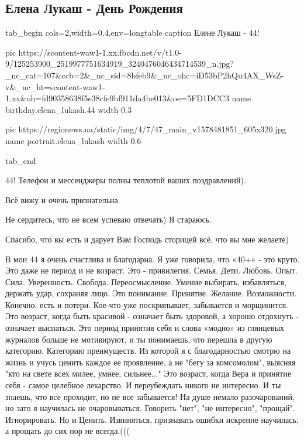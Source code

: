  
 

 

\subsection{Елена Лукаш - День Рождения}
\label{sec:12_11_2020.fb.elena_lukash.1.dr_44}

\ifcmt
tab_begin cols=2,width=0.4,env=longtable
  	caption Елене Лукаш - 44!

    pic https://scontent-waw1-1.xx.fbcdn.net/v/t1.0-9/125253900_2519977751634919_3240476046434714539_n.jpg?_nc_cat=107&ccb=2&_nc_sid=8bfeb9&_nc_ohc=iD53bP2hQu4AX_WsZ-v&_nc_ht=scontent-waw1-1.xx&oh=fd90358638f5e38cfe9bf911da4be013&oe=5FD1DCC3
    name birthday.elena_lukash.44
    width 0.3

    pic https://regionews.ua/static/img/4/7/47_main_v1578481851_605x320.jpg
    name portrait.elena_lukash
    width 0.6

tab_end
\fi

44!
\obeycr
Телефон и мессенджеры полны теплотой ваших поздравлений). 

Всё вижу и очень признательна.

Не сердитесь, что не всем успеваю отвечать) Я стараюсь. 

Спасибо, что вы есть и дарует Вам Господь сторицей всё, что вы мне желаете)  

В мои 44 я очень счастлива и благодарна.
Я уже говорила, что «40+» - это круто. 
Это даже не период и не возраст. 
Это - привилегия. 
Семья. Дети. Любовь. Опыт. Сила. Уверенность. Свобода. 
Переосмысление. 
Умение выбирать, избавляться, держать удар, сохраняя лицо. 
Это понимание.
Принятие. 
Желание. 
Возможности.   
Конечно, есть и потери. 
Кое-что уже поскрипывает, забывается и морщинится.
Это возраст, когда быть красивой - означает быть здоровой, а хорошо отдохнуть -  означает выспаться. 
Это период принятия себя и слова «модно» из глянцевых журналов больше не мотивируют, и ты понимаешь, что перешла в другую категорию. 
Категорию преимуществ. 
Из которой я с благодарностью  смотрю на жизнь и учусь ценить каждое ее проявление, а не "бегу за комсомолом", выясняя "кто на свете всех милее, умнее, сильнее..." 
Это возраст, когда Вера и принятие себя - самое целебное лекарство. 
И переубеждать никого не интересно. 
И ты знаешь, что все проходит, но не все забывается! 
На душе немало разочарований, но зато я научилась не очаровываться. 
Говорить "нет", "не интересно", "прощай". Игнорировать. Но и Ценить. 
Извиняться, признавать ошибки искренне научилась, а прощать до сих пор не всегда.((( 

